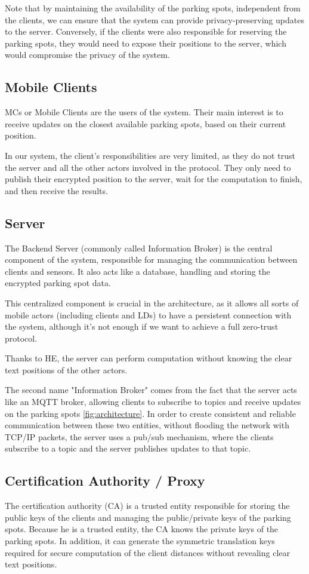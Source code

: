 Note that by maintaining the availability of the parking spots, independent from the clients, we can ensure that the system can provide privacy-preserving updates to the server. Conversely, if the clients were also responsible for reserving the parking spots, they would need to expose their positions to the server, which would compromise the privacy of the system.

\subsection{Mobile Clients}
MCs or Mobile Clients are the users of the system. Their main interest is to receive updates on the closest available parking spots, based on their current position. 

In our system, the client's responsibilities are very limited, as they do not trust the server and all the other actors involved in the protocol. They only need to publish their encrypted position to the server, wait for the computation to finish, and then receive the results.

\subsection{Server}
The Backend Server (commonly called Information Broker) is the central component of the system, responsible for managing the communication between clients and sensors. It also acts like a database, handling and storing the encrypted parking spot data.

This centralized component is crucial in the architecture, as it allows all sorts of mobile actors (including clients and LDs) to have a persistent connection with the system, although it's not enough if we want to achieve a full zero-trust protocol.

Thanks to HE, the server can perform computation without knowing the clear text positions of the other actors.

The second name "Information Broker" comes from the fact that the server acts like an MQTT broker, allowing clients to subscribe to topics and receive updates on the parking spots \cref{fig:architecture}. In order to create consistent and reliable communication between these two entities, without flooding the network with TCP/IP packets, the server uses a pub/sub mechanism, where the clients subscribe to a topic and the server publishes updates to that topic.

\subsection{Certification Authority / Proxy}
The certification authority (CA) is a trusted entity responsible for storing the public keys of the clients and managing the public/private keys of the parking spots. Because he is a trusted entity, the CA knows the private keys of the parking spots. In addition, it can generate the symmetric translation keys required for secure computation of the client distances without revealing clear text positions.

